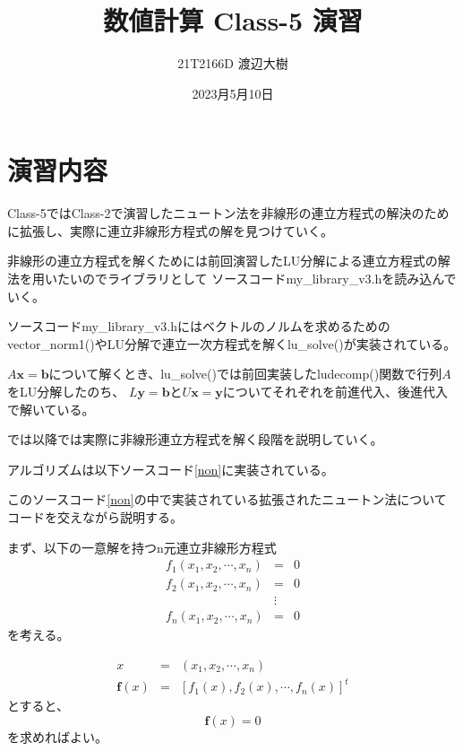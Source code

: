 \documentclass[a4paper,11pt]{jsarticle}
\begin{document}
\title{数値計算 Class-5 演習}
\author{21T2166D 渡辺大樹}
\date{2023月5月10日}
\maketitle

\section{演習内容}
Class-5ではClass-2で演習したニュートン法を非線形の連立方程式の解決のために拡張し、実際に連立非線形方程式の解を見つけていく。

非線形の連立方程式を解くためには前回演習したLU分解による連立方程式の解法を用いたいのでライブラリとして
ソースコードmy\_library\_v3.hを読み込んでいく。

ソースコードmy\_library\_v3.hにはベクトルのノルムを求めるためのvector\_norm1()やLU分解で連立一次方程式を解くlu\_solve()が実装されている。

$A\textbf{x}=\textbf{b}$について解くとき、lu\_solve()では前回実装したludecomp()関数で行列$A$をLU分解したのち、
$L\textbf{y}=\textbf{b}$と$U\textbf{x}=\textbf{y}$についてそれぞれを前進代入、後進代入で解いている。

では以降では実際に非線形連立方程式を解く段階を説明していく。

アルゴリズムは以下ソースコード\ref{non}に実装されている。


\newpage
このソースコード\ref{non}の中で実装されている拡張されたニュートン法についてコードを交えながら説明する。

まず、以下の一意解を持つn元連立非線形方程式
\begin{displaymath}
    \begin{array}{lll}
        f_1(x_1,x_2,\cdots,x_n) &=& 0 \\
        f_2(x_1,x_2,\cdots,x_n) &=& 0 \\
        & \vdots & \\
        f_n(x_1,x_2,\cdots,x_n) &=& 0 
    \end{array}
\end{displaymath}
を考える。

\begin{displaymath}
    \begin{array}{lll}
        x &=& (x_1,x_2,\cdots,x_n) \\
        \textbf{f}(x) &=& [f_1(x), f_2(x), \cdots, f_n(x)]^t
    \end{array}
\end{displaymath}
とすると、
\begin{displaymath}
    \textbf{f}(x) = 0
\end{displaymath}
を求めればよい。
\end{document}
